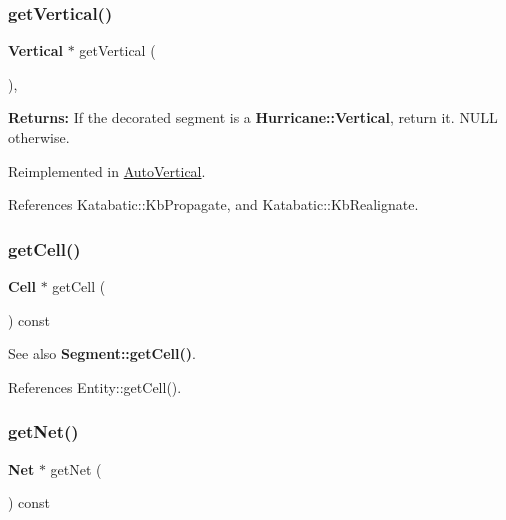 \subsubsection{\texorpdfstring{get\+Vertical()}{getVertical()}}
{\footnotesize\ttfamily \textbf{ Vertical} $\ast$ get\+Vertical (\begin{DoxyParamCaption}{ }\end{DoxyParamCaption})\hspace{0.3cm}{\ttfamily [inline]}, {\ttfamily [virtual]}}

{\bfseries Returns\+:} If the decorated segment is a \textbf{ Hurricane\+::\+Vertical}, return it. {\ttfamily N\+U\+LL} otherwise. 

Reimplemented in \hyperlink{classKatabatic_1_1AutoVertical_ab6a809b6f3ef3cf5385fa35580e31e7a}{Auto\+Vertical}.



References Katabatic\+::\+Kb\+Propagate, and Katabatic\+::\+Kb\+Realignate.

\mbox{\label{classKatabatic_1_1AutoSegment_a55a3a88610ef1af9931e634f77f2403b}} 
\subsubsection{\texorpdfstring{get\+Cell()}{getCell()}}
{\footnotesize\ttfamily \textbf{ Cell} $\ast$ get\+Cell (\begin{DoxyParamCaption}{ }\end{DoxyParamCaption}) const\hspace{0.3cm}{\ttfamily [inline]}}

\begin{DoxySeeAlso}{See also}
\textbf{ Segment\+::get\+Cell()}. 
\end{DoxySeeAlso}


References Entity\+::get\+Cell().

\mbox{\label{classKatabatic_1_1AutoSegment_a692492374623a5c6096b2c4a51190359}} 
\subsubsection{\texorpdfstring{get\+Net()}{getNet()}}
{\footnotesize\ttfamily \textbf{ Net} $\ast$ get\+Net (\begin{DoxyParamCaption}{ }\end{DoxyParamCaption}) const\hspace{0.3cm}{\ttfamily [inline]}}

